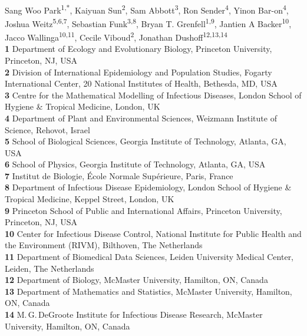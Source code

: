 \documentclass[12pt]{article}
\date{\today}
\begin{document}
\begin{flushleft}{
	\Large
	\textbf{}
}
\newline
\\
Sang Woo Park\textsuperscript{1,*},
Kaiyuan Sun\textsuperscript{2},
Sam Abbott\textsuperscript{3},
Ron Sender\textsuperscript{4},
Yinon Bar-on\textsuperscript{4},
Joshua Weitz\textsuperscript{5,6,7},
Sebastian Funk\textsuperscript{3,8}, 
Bryan T. Grenfell\textsuperscript{1,9},
Jantien A Backer\textsuperscript{10},
Jacco Wallinga\textsuperscript{10,11},
Cecile Viboud\textsuperscript{2},
Jonathan Dushoff\textsuperscript{12,13,14}
\\
\bigskip
\textbf{1} Department of Ecology and Evolutionary Biology, Princeton University, Princeton, NJ, USA
\\
\textbf{2} Division of International Epidemiology and Population Studies, Fogarty International Center, 20 National Institutes of Health, Bethesda, MD, USA
\\
\textbf{3} Centre for the Mathematical Modelling of Infectious Diseases, London School of Hygiene \& Tropical Medicine, London, UK
\\
\textbf{4} Department of Plant and Environmental Sciences, Weizmann Institute of Science, Rehovot, Israel
\\
\textbf{5} School of Biological Sciences, Georgia Institute of Technology, Atlanta, GA, USA
\\
\textbf{6} School of Physics, Georgia Institute of Technology, Atlanta, GA, USA
\\
\textbf{7} Institut de Biologie, \'{E}cole Normale Sup\'{e}rieure, Paris, France
\\
\textbf{8} Department of Infectious Disease Epidemiology, London School of Hygiene \& Tropical Medicine, Keppel Street, London, UK
\\
\textbf{9} Princeton School of Public and International Affairs, Princeton University, Princeton, NJ, USA
\\
\textbf{10} Center for Infectious Disease Control, National Institute for Public Health and the Environment (RIVM), Bilthoven, The Netherlands
\\
\textbf{11} Department of Biomedical Data Sciences, Leiden University Medical Center, Leiden, The Netherlands
\\
\textbf{12} Department of Biology, McMaster University, Hamilton, ON, Canada
\\
\textbf{13} Department of Mathematics and Statistics, McMaster University, Hamilton, ON, Canada
\\
\textbf{14} M.\,G.\,DeGroote Institute for Infectious Disease Research, McMaster University, Hamilton, ON, Canada
\\
\bigskip


\end{flushleft}
\end{document}
